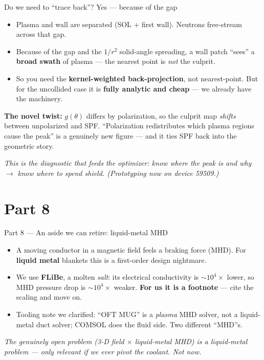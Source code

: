 \documentclass[11pt,aspectratio=169]{beamer}
\newcommand{\key}[1]{\textcolor{key}{\textbf{#1}}}
\newcommand{\qq}[1]{\begin{center}\emph{#1}\end{center}}
\begin{document}
\begin{frame}{Do we need to ``trace back''? Yes --- because of the gap}
\begin{itemize}
\item Plasma and wall are separated (SOL + first wall). Neutrons free-stream across that gap.
\item Because of the gap and the \(1/r^2\) solid-angle spreading, a wall patch ``sees'' a
      \key{broad swath} of plasma --- the nearest point is \emph{not} the culprit.
\item So you need the \key{kernel-weighted back-projection}, not nearest-point. But for the
      uncollided case it is \key{fully analytic and cheap} --- we already have the machinery.
\end{itemize}
\key{The novel twist:} \(g(\theta)\) differs by polarization, so the culprit map \emph{shifts}
between unpolarized and SPF. ``Polarization redistributes which plasma regions cause the
peak'' is a genuinely new figure --- and it ties SPF back into the geometric story.
\qq{This is the diagnostic that feeds the optimizer: know \emph{where} the peak is and
\emph{why} $\to$ know where to spend shield. (Prototyping now on device 59509.)}
\end{frame}

\section{Part 8}
\begin{frame}{Part 8 --- An aside we can retire: liquid-metal MHD}
\begin{itemize}
\item A moving conductor in a magnetic field feels a braking force (MHD). For \key{liquid
      metal} blankets this is a first-order design nightmare.
\item We use \key{FLiBe}, a molten \emph{salt}: its electrical conductivity is $\sim\!10^4\times$
      lower, so MHD pressure drop is $\sim\!10^4\times$ weaker. \key{For us it is a footnote}
      --- cite the scaling and move on.
\item Tooling note we clarified: ``OFT MUG'' is a \emph{plasma} MHD solver, not a
      liquid-metal duct solver; COMSOL does the fluid side. Two different ``MHD''s.
\end{itemize}
\qq{The genuinely open problem (3-D field $\times$ liquid-metal MHD) is a \emph{liquid-metal}
problem --- only relevant if we ever pivot the coolant. Not now.}
\end{frame}
\end{document}
